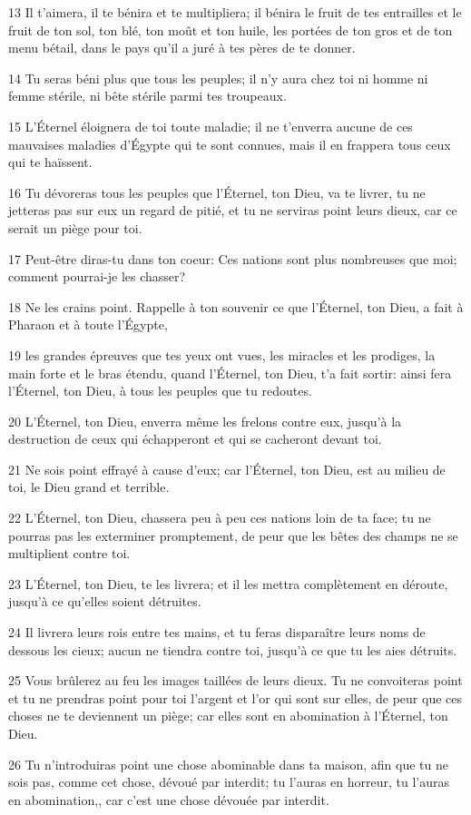 \par 13 Il t'aimera, il te bénira et te multipliera; il bénira le fruit de tes entrailles et le fruit de ton sol, ton blé, ton moût et ton huile, les portées de ton gros et de ton menu bétail, dans le pays qu'il a juré à tes pères de te donner.
\par 14 Tu seras béni plus que tous les peuples; il n'y aura chez toi ni homme ni femme stérile, ni bête stérile parmi tes troupeaux.
\par 15 L'Éternel éloignera de toi toute maladie; il ne t'enverra aucune de ces mauvaises maladies d'Égypte qui te sont connues, mais il en frappera tous ceux qui te haïssent.
\par 16 Tu dévoreras tous les peuples que l'Éternel, ton Dieu, va te livrer, tu ne jetteras pas sur eux un regard de pitié, et tu ne serviras point leurs dieux, car ce serait un piège pour toi.
\par 17 Peut-être diras-tu dans ton coeur: Ces nations sont plus nombreuses que moi; comment pourrai-je les chasser?
\par 18 Ne les crains point. Rappelle à ton souvenir ce que l'Éternel, ton Dieu, a fait à Pharaon et à toute l'Égypte,
\par 19 les grandes épreuves que tes yeux ont vues, les miracles et les prodiges, la main forte et le bras étendu, quand l'Éternel, ton Dieu, t'a fait sortir: ainsi fera l'Éternel, ton Dieu, à tous les peuples que tu redoutes.
\par 20 L'Éternel, ton Dieu, enverra même les frelons contre eux, jusqu'à la destruction de ceux qui échapperont et qui se cacheront devant toi.
\par 21 Ne sois point effrayé à cause d'eux; car l'Éternel, ton Dieu, est au milieu de toi, le Dieu grand et terrible.
\par 22 L'Éternel, ton Dieu, chassera peu à peu ces nations loin de ta face; tu ne pourras pas les exterminer promptement, de peur que les bêtes des champs ne se multiplient contre toi.
\par 23 L'Éternel, ton Dieu, te les livrera; et il les mettra complètement en déroute, jusqu'à ce qu'elles soient détruites.
\par 24 Il livrera leurs rois entre tes mains, et tu feras disparaître leurs noms de dessous les cieux; aucun ne tiendra contre toi, jusqu'à ce que tu les aies détruits.
\par 25 Vous brûlerez au feu les images taillées de leurs dieux. Tu ne convoiteras point et tu ne prendras point pour toi l'argent et l'or qui sont sur elles, de peur que ces choses ne te deviennent un piège; car elles sont en abomination à l'Éternel, ton Dieu.
\par 26 Tu n'introduiras point une chose abominable dans ta maison, afin que tu ne sois pas, comme cet chose, dévoué par interdit; tu l'auras en horreur, tu l'auras en abomination,, car c'est une chose dévouée par interdit.

